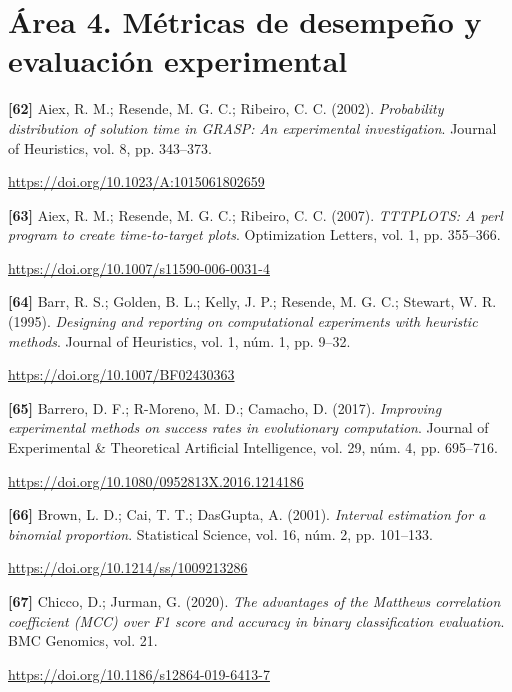 \documentclass[11pt,a4paper]{article}
\newcommand{\referencia}[1]{\par\addvspace{0.8\baselineskip}\noindent\hangindent=1.1cm\hangafter=1 #1\par\nopagebreak}
\begin{document}
\section*{Área 4. Métricas de desempeño y evaluación experimental}
\begin{samepage}
\referencia{\textbf{[62]} Aiex, R. M.; Resende, M. G. C.; Ribeiro, C. C. (2002). \textit{Probability distribution of solution time in {GRASP}: An experimental investigation}. Journal of Heuristics, vol. 8, pp. 343--373.}
 {\small\url{https://doi.org/10.1023/A:1015061802659}}\par
\end{samepage}
\begin{samepage}
\referencia{\textbf{[63]} Aiex, R. M.; Resende, M. G. C.; Ribeiro, C. C. (2007). \textit{{TTTPLOTS}: A perl program to create time-to-target plots}. Optimization Letters, vol. 1, pp. 355--366.}
 {\small\url{https://doi.org/10.1007/s11590-006-0031-4}}\par
\end{samepage}
\begin{samepage}
\referencia{\textbf{[64]} Barr, R. S.; Golden, B. L.; Kelly, J. P.; Resende, M. G. C.; Stewart, W. R. (1995). \textit{Designing and reporting on computational experiments with heuristic methods}. Journal of Heuristics, vol. 1, núm. 1, pp. 9--32.}
 {\small\url{https://doi.org/10.1007/BF02430363}}\par
\end{samepage}
\begin{samepage}
\referencia{\textbf{[65]} Barrero, D. F.; R-Moreno, M. D.; Camacho, D. (2017). \textit{Improving experimental methods on success rates in evolutionary computation}. Journal of Experimental \& Theoretical Artificial Intelligence, vol. 29, núm. 4, pp. 695--716.}
 {\small\url{https://doi.org/10.1080/0952813X.2016.1214186}}\par
\end{samepage}
\begin{samepage}
\referencia{\textbf{[66]} Brown, L. D.; Cai, T. T.; DasGupta, A. (2001). \textit{Interval estimation for a binomial proportion}. Statistical Science, vol. 16, núm. 2, pp. 101--133.}
 {\small\url{https://doi.org/10.1214/ss/1009213286}}\par
\end{samepage}
\begin{samepage}
\referencia{\textbf{[67]} Chicco, D.; Jurman, G. (2020). \textit{The advantages of the {Matthews} correlation coefficient ({MCC}) over {F1} score and accuracy in binary classification evaluation}. BMC Genomics, vol. 21.}
 {\small\url{https://doi.org/10.1186/s12864-019-6413-7}}\par
\end{samepage}
\end{document}
